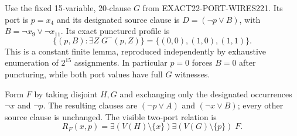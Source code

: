 \documentclass[11pt]{article}
\begin{document}
Use the fixed 15-variable, 20-clause $G$ from EXACT22-PORT-WIRES221. Its port is $p=x_4$ and its designated source clause is $D=(\neg p\lor B)$, with $B=\neg x_9\lor\neg x_{11}$. Its exact punctured profile is
\[
 \{(p,B):\exists Z\;G^{-}(p,Z)\}=\{(0,0),(1,0),(1,1)\}.
\]
This is a constant finite lemma, reproduced independently by exhaustive enumeration of $2^{15}$ assignments. In particular $p=0$ forces $B=0$ after puncturing, while both port values have full $G$ witnesses.

Form $F$ by taking disjoint $H,G$ and exchanging only the designated occurrences $\neg x$ and $\neg p$. The resulting clauses are $(\neg p\lor A)$ and $(\neg x\lor B)$; every other source clause is unchanged. The visible two-port relation is
\[
 R_F(x,p)=\exists(V(H)\setminus\{x\})\exists(V(G)\setminus\{p\})\;F.
\]
\end{document}
